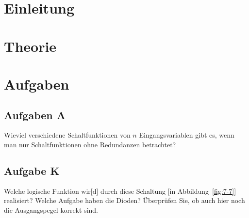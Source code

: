 \tableofcontents
\newpage


\FloatBarrier
\section{Einleitung}


\FloatBarrier
\section{Theorie}


\FloatBarrier
\section{Aufgaben}

\FloatBarrier
\subsection{Aufgaben A}

\begin{problem}
    Wieviel verschiedene Schaltfunktionen von $n$ Eingangsvariablen gibt es,
    wenn man nur Schaltfunktionen ohne Redundanzen betrachtet?
\end{problem}

\FloatBarrier
\subsection{Aufgabe K}

\begin{problem}
	Welche logische Funktion wir[d] durch diese Schaltung [in
	Abbildung~\ref{fig:7-7}] realisiert? Welche Aufgabe haben die Dioden?
	Überprüfen Sie, ob auch hier noch die Ausgangspegel korrekt sind.
\end{problem}


